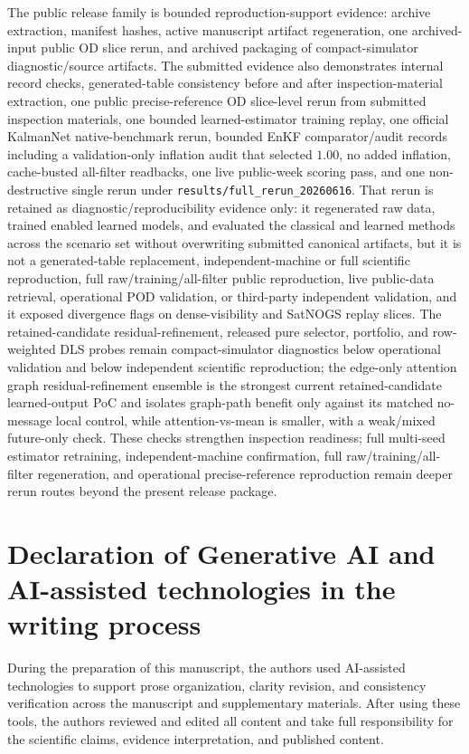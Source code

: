 \documentclass{article}
\begin{document}
The public release family is bounded reproduction-support evidence: archive extraction, manifest hashes, active manuscript artifact regeneration, one archived-input public OD slice rerun, and archived packaging of compact-simulator diagnostic/source artifacts. The submitted evidence also demonstrates internal record checks, generated-table consistency before and after inspection-material extraction, one public precise-reference OD slice-level rerun from submitted inspection materials, one bounded learned-estimator training replay, one official KalmanNet native-benchmark rerun, bounded EnKF comparator/audit records including a validation-only inflation audit that selected \(1.00\), no added inflation, cache-busted all-filter readbacks, one live public-week scoring pass, and one non-destructive single rerun under \nolinkurl{results/full_rerun_20260616}. That rerun is retained as diagnostic/reproducibility evidence only: it regenerated raw data, trained enabled learned models, and evaluated the classical and learned methods across the scenario set without overwriting submitted canonical artifacts, but it is not a generated-table replacement, independent-machine or full scientific reproduction, full raw/training/all-filter public reproduction, live public-data retrieval, operational POD validation, or third-party independent validation, and it exposed divergence flags on dense-visibility and SatNOGS replay slices. The retained-candidate residual-refinement, released pure selector, portfolio, and row-weighted DLS probes remain compact-simulator diagnostics below operational validation and below independent scientific reproduction; the edge-only attention graph residual-refinement ensemble is the strongest current retained-candidate learned-output PoC and isolates graph-path benefit only against its matched no-message local control, while attention-vs-mean is smaller, with a weak/mixed future-only check. These checks strengthen inspection readiness; full multi-seed estimator retraining, independent-machine confirmation, full raw/training/all-filter regeneration, and operational precise-reference reproduction remain deeper rerun routes beyond the present release package.

\section*{Declaration of Generative AI and AI-assisted technologies in the writing process}
During the preparation of this manuscript, the authors used AI-assisted technologies to support prose organization, clarity revision, and consistency verification across the manuscript and supplementary materials. After using these tools, the authors reviewed and edited all content and take full responsibility for the scientific claims, evidence interpretation, and published content.



\end{document}
